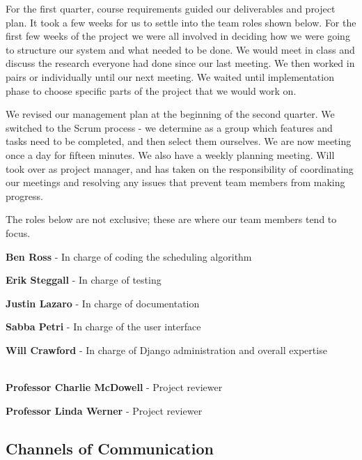 \documentclass[12pt]{article}
\begin{document}
\begin{enumerate}
\begin{enumerate}
For the first quarter, course requirements guided our deliverables and project plan. It took a few weeks for us to settle into the team roles shown below. For the first few weeks of the project we were all involved in deciding how we were going to structure our system and what needed to be done. We would meet in class and discuss the research everyone had done since our last meeting. We then worked in pairs or individually until our next meeting. We waited until implementation phase to choose specific parts of the project that we would work on. 
 
We revised our management plan at the beginning of the second quarter. We switched to the Scrum process - we determine as a group which features and tasks need to be completed, and then select them ourselves. We are now meeting once a day for fifteen minutes. We also have a weekly planning meeting. Will took over as project manager, and has taken on the responsibility of coordinating our meetings and resolving any issues that prevent team members from making progress. 

The roles below are not exclusive; these are where our team members tend to focus.
	
\begin{description}
\item{\textbf{Ben Ross}} - In charge of coding the scheduling algorithm
\item{\textbf{Erik Steggall}} - In charge of testing
\item{\textbf{Justin Lazaro}} - In charge of documentation
\item{\textbf{Sabba Petri}} - In charge of the user interface
\item{\textbf{Will Crawford}} - In charge of Django administration and overall expertise \\ \\
\item{\textbf{Professor Charlie McDowell}} - Project reviewer
\item{\textbf{Professor Linda Werner}} - Project reviewer
\end{description}

\subsection{Channels of Communication}


\end{enumerate}
\end{enumerate}
\end{document}
